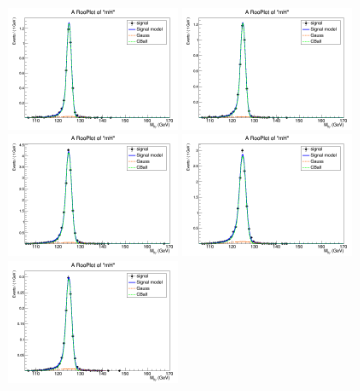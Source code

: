 \begin{figure}[htb]
	\begin{center}
		\includegraphics[width=0.40\textwidth]{fig/signal_fit/2018/sigfit_mu_ggF_1_125.png}
		\includegraphics[width=0.40\textwidth]{fig/signal_fit/2018/sigfit_mu_ggF_2_125.png}\\
		\includegraphics[width=0.40\textwidth]{fig/signal_fit/2018/sigfit_mu_ggF_3_125.png}
		\includegraphics[width=0.40\textwidth]{fig/signal_fit/2018/sigfit_mu_ggF_4_125.png}\\
		\includegraphics[width=0.40\textwidth]{fig/signal_fit/2018/sigfit_mu_VBF_501_125.png}

\end{center}
\end{figure}
